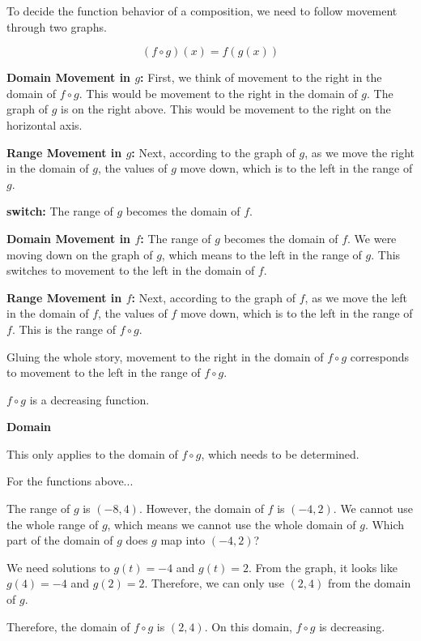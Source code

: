 \documentclass{ximera}
\begin{document}
To decide the function behavior of a composition, we need to follow movement through two graphs. 



\[
(f \circ g)(x) = f(g(x))
\]



\textbf{\textcolor{blue!55!black}{Domain Movement in $g$:}}  First, we think of movement to the right in the domain of $f \circ g$.  This would be movement to the right in the domain of $g$.  The graph of $g$ is on the right above.  This would be movement to the right on the horizontal axis.



\textbf{\textcolor{blue!55!black}{Range Movement in $g$:}}  Next, according to the graph of $g$, as we move the right in the domain of $g$, the values of $g$ move down, which is to the left in the range of $g$.




\textbf{\textcolor{blue!55!black}{switch:}}   The range of $g$ becomes the domain of $f$.  


\textbf{\textcolor{blue!55!black}{Domain Movement in $f$:}}   The range of $g$ becomes the domain of $f$.  We were moving down on the graph of $g$, which means to the left in the range of $g$.  This switches to movement to the left in the domain of $f$.


\textbf{\textcolor{blue!55!black}{Range Movement in $f$:}}  Next, according to the graph of $f$, as we move the left in the domain of $f$, the values of $f$ move down, which is to the left in the range of $f$.  This is the range of $f \circ g$.




Gluing the whole story, movement to the right in the domain of $f \circ g$ corresponds to movement to the left in the range of $f \circ g$.

$f \circ g$ is a decreasing function.



\begin{observation} \textbf{\textcolor{-red!75}{Domain}}


This only applies to the domain of $f \circ g$, which needs to be determined. 


For the functions above...

The range of $g$ is $(-8, 4)$.  However, the domain of $f$ is $(-4, 2)$.   We cannot use the whole range of $g$, which means we cannot use the whole domain of $g$.  Which part of the domain of $g$ does $g$ map into $(-4, 2)$? 


We need solutions to $g(t) = -4$ and $g(t) = 2$.  From the graph, it looks like $g(4) = -4$  and $g(2) = 2$. Therefore, we can only use $(2, 4)$ from the domain of $g$.


Therefore, the domain of $f \circ g$ is $(2, 4)$.  On this domain, $f \circ g$ is decreasing.



\end{observation}
\end{document}
